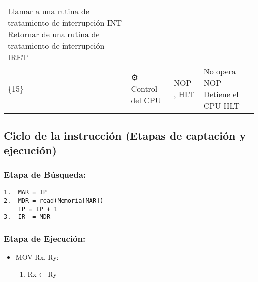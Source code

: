 \documentclass[12pt,twoside]{templates/unerthesis}
\providecommand{\tightlist}{%
  \setlength{\itemsep}{0pt}\setlength{\parskip}{0pt}}
\begin{document}
\begin{longtable}[]{@{}llll@{}}
\begin{minipage}[t]{0.56\columnwidth}
Llamar a una rutina de tratamiento de interrupción INT Retornar de una rutina de tratamiento de interrupción IRET\strut
\end{minipage}\tabularnewline
\begin{minipage}[t]{0.14\columnwidth}\raggedright
\{15\}\strut
\end{minipage} & \begin{minipage}[t]{0.11\columnwidth}\raggedright
⚙️ Control del CPU\strut
\end{minipage} & \begin{minipage}[t]{0.08\columnwidth}\raggedright
NOP , HLT\strut
\end{minipage} & \begin{minipage}[t]{0.56\columnwidth}\raggedright
No opera NOP Detiene el CPU HLT\strut
\end{minipage}\tabularnewline
\bottomrule
\end{longtable}

\hypertarget{ciclo-de-la-instrucciuxf3n-etapas-de-captaciuxf3n-y-ejecuciuxf3n}{%
\subsection{Ciclo de la instrucción (Etapas de captación y ejecución)}\label{ciclo-de-la-instrucciuxf3n-etapas-de-captaciuxf3n-y-ejecuciuxf3n}}

\hypertarget{etapa-de-buxfasqueda}{%
\subsubsection{\texorpdfstring{\textbf{Etapa de Búsqueda}:}{Etapa de Búsqueda:}}\label{etapa-de-buxfasqueda}}

\begin{verbatim}
1.  MAR = IP 
2.  MDR = read(Memoria[MAR])
    IP = IP + 1
3.  IR  = MDR
\end{verbatim}

\hypertarget{etapa-de-ejecuciuxf3n}{%
\subsubsection{\texorpdfstring{\textbf{Etapa de Ejecución}:}{Etapa de Ejecución:}}\label{etapa-de-ejecuciuxf3n}}

\begin{itemize}
\tightlist
\item
  MOV Rx, Ry:

  \begin{enumerate}
  \def\labelenumi{\arabic{enumi}.}
  \tightlist
  \item
    Rx ← Ry
  \end{enumerate}
\end{itemize}
\end{document}
